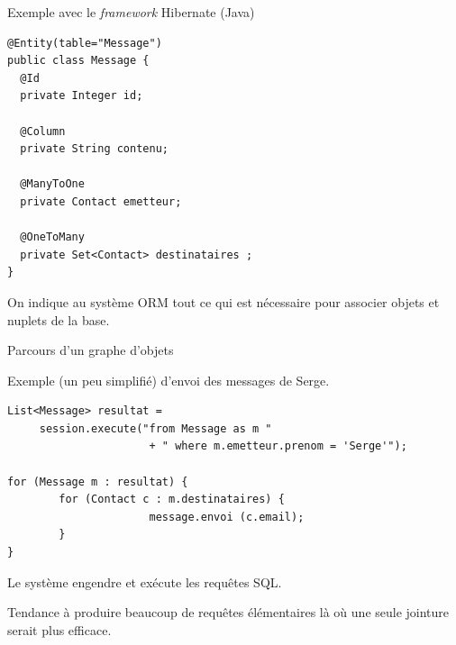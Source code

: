 \begin{frame}[fragile]{Exemple avec le \textit{framework} Hibernate (Java)}

\begin{verbatim}
@Entity(table="Message")
public class Message {
  @Id
  private Integer id;
  
  @Column
  private String contenu;
  
  @ManyToOne
  private Contact emetteur;
  
  @OneToMany
  private Set<Contact> destinataires ;
}
\end{verbatim}


\vfill

\begin{blocgauche}
On indique au système ORM tout ce qui est nécessaire pour associer
objets et nuplets de la base.
\end{blocgauche}
\end{frame}


\begin{frame}[fragile]{Parcours d'un graphe d'objets}

Exemple (un peu simplifié) d'envoi des messages de Serge. 
\vfill
\begin{verbatim}
List<Message> resultat =
     session.execute("from Message as m "
                      + " where m.emetteur.prenom = 'Serge'");
                      
for (Message m : resultat) {
        for (Contact c : m.destinataires) {
                      message.envoi (c.email);
        }
}
\end{verbatim}

\vfill

Le système engendre et exécute les requêtes SQL. 

\vfill

\begin{blocgauche}
Tendance à 
produire \alert{beaucoup} de requêtes élémentaires là où \alert{une seule}
jointure
serait plus efficace.
\end{blocgauche}
\end{frame}

